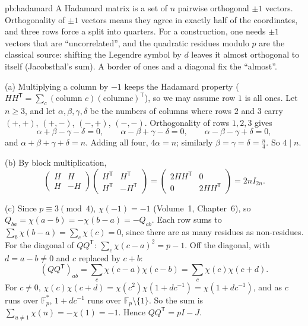 \begin{solution}{pb:hadamard}
\idea A Hadamard matrix is a set of $n$ pairwise orthogonal $\pm1$ vectors. Orthogonality of $\pm1$ vectors means they agree
in exactly half of the coordinates, and three rows force a split into quarters. For a construction, one needs $\pm1$
vectors that are ``uncorrelated'', and the quadratic residues modulo $p$ are the classical source: shifting the Legendre
symbol by $d$ leaves it almost orthogonal to itself (Jacobsthal's sum). A border of ones and a diagonal fix the ``almost''.

\writeup (a) Multiplying a column by $-1$ keeps the Hadamard property ($HH^{\mathsf T}=\sum_c(\text{column }c)(\text{column
}c)^{\mathsf T}$), so we may assume row $1$ is all ones. Let $n\ge3$, and let $\alpha,\beta,\gamma,\delta$ be the numbers of
columns where rows $2$ and $3$ carry $(+,+)$, $(+,-)$, $(-,+)$, $(-,-)$. Orthogonality of rows $1,2,3$ gives
\[
\alpha+\beta-\gamma-\delta=0,\qquad\alpha-\beta+\gamma-\delta=0,\qquad\alpha-\beta-\gamma+\delta=0,
\]
and $\alpha+\beta+\gamma+\delta=n$. Adding all four, $4\alpha=n$; similarly $\beta=\gamma=\delta=\frac n4$. So $4\mid n$.

(b) By block multiplication,
\[
\begin{pmatrix}H&H\\H&-H\end{pmatrix}\begin{pmatrix}H^{\mathsf T}&H^{\mathsf T}\\H^{\mathsf T}&-H^{\mathsf T}\end{pmatrix}
=\begin{pmatrix}2HH^{\mathsf T}&0\\0&2HH^{\mathsf T}\end{pmatrix}=2nI_{2n}.
\]

(c) Since $p\equiv3\pmod4$, $\chi(-1)=-1$ (Volume~1, Chapter~6), so $Q_{ba}=\chi(a-b)=-\chi(b-a)=-Q_{ab}$. Each row sums to
$\sum_b\chi(b-a)=\sum_c\chi(c)=0$, since there are as many residues as non-residues. For the diagonal of $QQ^{\mathsf T}$:
$\sum_c\chi(c-a)^2=p-1$. Off the diagonal, with $d=a-b\ne0$ and $c$ replaced by $c+b$:
\[
(QQ^{\mathsf T})_{ab}=\sum_c\chi(c-a)\chi(c-b)=\sum_c\chi(c)\chi(c+d).
\]
For $c\ne0$, $\chi(c)\chi(c+d)=\chi(c^2)\chi(1+dc^{-1})=\chi(1+dc^{-1})$, and as $c$ runs over $\mathbb F_p^*$, $1+dc^{-1}$
runs over $\mathbb F_p\setminus\{1\}$. So the sum is $\sum_{u\ne1}\chi(u)=-\chi(1)=-1$. Hence $QQ^{\mathsf T}=pI-J$.


\end{solution}
